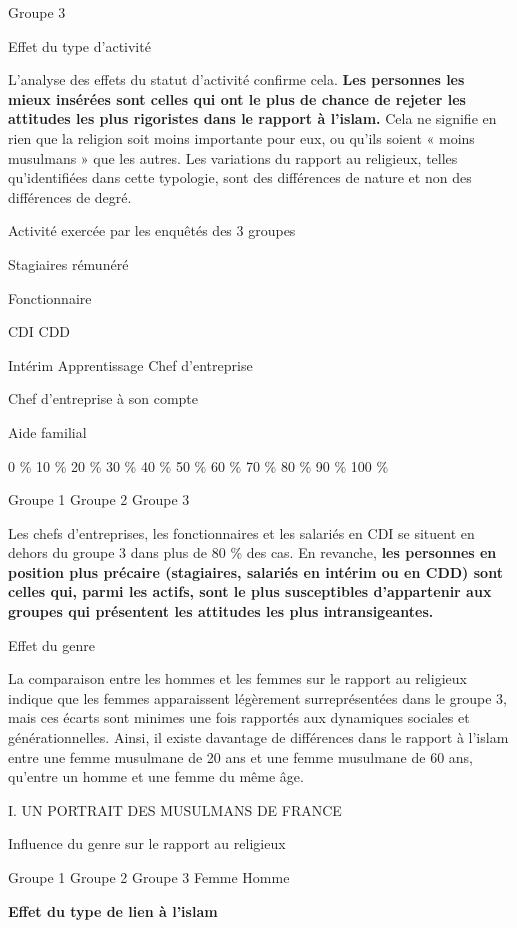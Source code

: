Groupe 3




Effet du type d'activité


L'analyse des effets du statut d'activité confirme cela. \textbf{Les
personnes les mieux insérées sont celles qui ont le plus de chance de
rejeter les attitudes les plus rigoristes dans le rapport à l'islam.}
Cela ne signifie en rien que la religion soit moins importante pour eux,
ou qu'ils soient « moins musulmans » que les autres. Les variations du
rapport au religieux, telles qu'identifiées dans cette typologie, sont
des différences de nature et non des différences de degré.


Activité exercée par les enquêtés des 3 groupes

Stagiaires rémunéré

Fonctionnaire


CDI CDD

Intérim Apprentissage Chef d'entreprise


Chef d'entreprise à son compte

Aide familial


0 \% 10 \% 20 \% 30 \% 40 \% 50 \% 60 \% 70 \% 80 \% 90 \% 100 \%

Groupe 1 Groupe 2 Groupe 3

Les chefs d'entreprises, les fonctionnaires et les salariés en CDI se
situent en dehors du groupe 3 dans plus de 80 \% des cas. En revanche,
\textbf{les personnes en position plus précaire (stagiaires, salariés en
intérim ou en CDD) sont celles qui, parmi les actifs, sont le plus
susceptibles d'appartenir aux groupes qui présentent les attitudes les
plus intransigeantes.}


Effet du genre


La comparaison entre les hommes et les femmes sur le rapport au
religieux indique que les femmes apparaissent légèrement surreprésentées
dans le groupe 3, mais ces écarts sont minimes une fois rapportés aux
dynamiques sociales et générationnelles. Ainsi, il existe davantage de
différences dans le rapport à l'islam entre une femme musulmane de 20
ans et une femme musulmane de 60 ans, qu'entre un homme et une femme du
même âge.

I. UN PORTRAIT DES MUSULMANS DE FRANCE


Influence du genre sur le rapport au religieux


Groupe 1 Groupe 2 Groupe 3 Femme Homme

\textbf{Effet du type de lien à l'islam}

